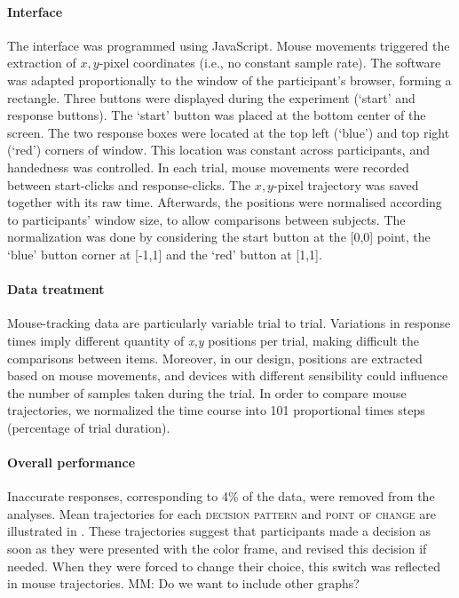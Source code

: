 \documentclass{article}
\newcommand{\addMM}[1]{{\leavevmode\color{red}#1}}
\begin{document}
\paragraph{Interface}
The interface was programmed using JavaScript. Mouse movements triggered the extraction of $x,y$-pixel coordinates (i.e., no constant sample rate). The software was adapted proportionally to the window of the participant's browser, forming a rectangle. 
Three buttons were displayed during the experiment (`start' and response buttons). The `start' button was placed at the bottom center of the screen. The two response boxes were located at the top left (`blue') and top right (`red') corners of window. This location was constant across participants, and handedness was controlled.  
In each trial, mouse movements were recorded between start-clicks and response-clicks. The $x,y$-pixel trajectory was saved together with its raw time. Afterwards, the positions were normalised according to participants' window size, to allow comparisons between subjects. The normalization was done by considering the start button at the [0,0] point, the `blue' button corner at [-1,1] and the `red' button at [1,1]. 

\paragraph{Data treatment}
Mouse-tracking data are particularly variable trial to trial. Variations in response times imply different quantity of \textit{x,y} positions per trial, making difficult the comparisons between items. Moreover, in our design, positions are extracted based on mouse movements, and devices with different sensibility could influence the number of samples taken during the trial. In order to compare mouse trajectories, we normalized the time course into 101 proportional times steps (percentage of trial duration). 

\paragraph{Overall performance}
Inaccurate responses, corresponding to 4\% of the data, were removed from the analyses. 
Mean trajectories for each \textsc{decision pattern} and \textsc{point of change} are illustrated in . 
These trajectories suggest that participants made a decision as soon as they were presented with the color frame, and revised this decision if needed. When they were forced to change their choice, this switch was reflected in mouse trajectories. 
\addMM{MM: Do we want to include other graphs?}
\end{document}
